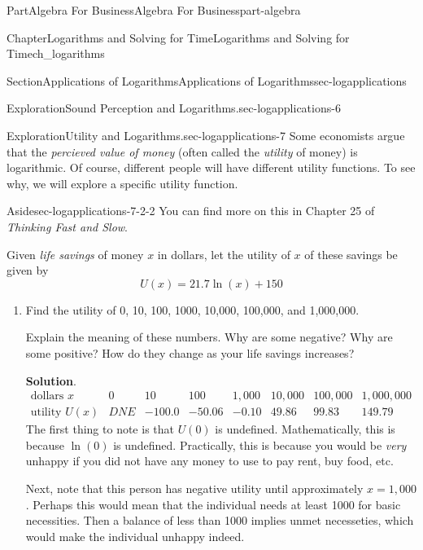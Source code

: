 \documentclass{tufte-book}
\newcommand{\blocktitlefont}{\relax}
\numberwithin{equation}{chapter}
\begin{document}
\begin{partptx}{Part}{Algebra For Business}{}{Algebra For Business}{}{}{part-algebra}
\begin{chapterptx}{Chapter}{Logarithms and Solving for Time}{}{Logarithms and Solving for Time}{}{}{ch_logarithms}
\begin{sectionptx}{Section}{Applications of Logarithms}{}{Applications of Logarithms}{}{}{sec-logapplications}
\begin{exploration}{Exploration}{Sound Perception and Logarithms.}{sec-logapplications-6}
\begin{enumerate}[font=\bfseries,label=(\alph*),ref=\alph*]
\end{enumerate}%
\end{exploration}%
%
\begin{exploration}{Exploration}{Utility and Logarithms.}{sec-logapplications-7}%
Some economists argue that the \emph{percieved value of money} (often called the \emph{utility} of money) is logarithmic. Of course, different people will have different utility functions. To see why, we will explore a specific utility function.%
\begin{aside}{Aside}{}{sec-logapplications-7-2-2}%
You can find more on this in Chapter 25 of \emph{Thinking Fast and Slow}. %
\end{aside}
Given \emph{life savings} of money \(x\) in dollars, let the utility of \textdollar{}\(x\) of these savings be given by%
\begin{equation*}
U(x) = 21.7\ln(x) + 150
\end{equation*}
%
\begin{enumerate}[font=\bfseries,label=(\alph*),ref=\alph*]%
\item{}Find the utility of \textdollar{}0, \textdollar{}10, \textdollar{}100, \textdollar{}1000, \textdollar{}10,000, \textdollar{}100,000, and \textdollar{}1,000,000.%
\par
Explain the meaning of these numbers.  Why are some negative? Why are some positive?  How do they change as your life savings increases?%
\par\smallskip%
\noindent\textbf{\blocktitlefont Solution}.\hypertarget{sec-logapplications-7-3-2}{}\quad{}%
\begin{equation*}
\begin{array}{c|c|c|c|c|c|c|c}
\text{dollars }x         
&  0 
&  10   
&  100  
&  1,000  
&  10,000 
&  100,000
&  1,000,000
\\ \hline
\text{utility }U(x)
& DNE
& -100.0	
& -50.06
& -0.10
& 49.86
& 99.83
& 149.79
\end{array}
\end{equation*}
The first thing to note is that \(U(0)\) is undefined.  Mathematically, this is because \(\ln(0)\) is undefined.  Practically, this is because you would be \emph{very} unhappy if you did not have any money to use to pay rent, buy food, etc.%
\par
Next, note that this person has negative utility until approximately \(x=1,000\).  Perhaps this would mean that the individual needs at least \textdollar{}1000 for basic necessities.  Then a balance of less than \textdollar{}1000 implies unmet necesseties, which would make the individual unhappy indeed.%

\end{enumerate}
\end{exploration}
\end{sectionptx}
\end{chapterptx}
\end{partptx}
\end{document}
